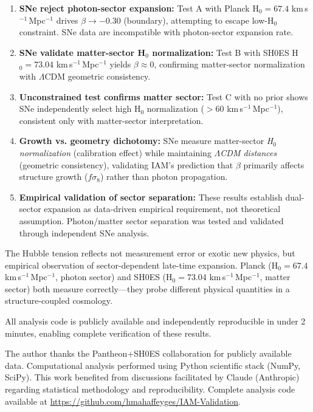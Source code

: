 \documentclass[twocolumn,superscriptaddress,prd,amsmath,amssymb]{revtex4-2}
\begin{document}
\begin{enumerate}
\item \textbf{SNe reject photon-sector expansion:} Test A with Planck H$_0 = 67.4$ km\,s$^{-1}$\,Mpc$^{-1}$ drives $\beta \to -0.30$ (boundary), attempting to escape low-H$_0$ constraint. SNe data are incompatible with photon-sector expansion rate.

\item \textbf{SNe validate matter-sector H$_0$ normalization:} Test B with SH0ES H$_0 = 73.04$ km\,s$^{-1}$\,Mpc$^{-1}$ yields $\beta \approx 0$, confirming matter-sector normalization with $\Lambda$CDM geometric consistency.

\item \textbf{Unconstrained test confirms matter sector:} Test C with no prior shows SNe independently select high H$_0$ normalization ($>60$ km\,s$^{-1}$\,Mpc$^{-1}$), consistent only with matter-sector interpretation.

\item \textbf{Growth vs. geometry dichotomy:} SNe measure matter-sector \textit{H$_0$ normalization} (calibration effect) while maintaining \textit{$\Lambda$CDM distances} (geometric consistency), validating IAM's prediction that $\beta$ primarily affects structure growth ($f\sigma_8$) rather than photon propagation.

\item \textbf{Empirical validation of sector separation:} These results establish dual-sector expansion as data-driven empirical requirement, not theoretical assumption. Photon/matter sector separation was tested and validated through independent SNe analysis.
\end{enumerate}

The Hubble tension reflects not measurement error or exotic new physics, but empirical observation of sector-dependent late-time expansion. Planck (H$_0 = 67.4$ km\,s$^{-1}$\,Mpc$^{-1}$, photon sector) and SH0ES (H$_0 = 73.04$ km\,s$^{-1}$\,Mpc$^{-1}$, matter sector) both measure correctly—they probe different physical quantities in a structure-coupled cosmology.

All analysis code is publicly available and independently reproducible in under 2 minutes, enabling complete verification of these results.

\begin{acknowledgments}
The author thanks the Pantheon+SH0ES collaboration for publicly available data. Computational analysis performed using Python scientific stack (NumPy, SciPy). This work benefited from discussions facilitated by Claude (Anthropic) regarding statistical methodology and reproducibility. Complete analysis code available at \url{https://github.com/hmahaffeyges/IAM-Validation}.
\end{acknowledgments}
\end{document}

